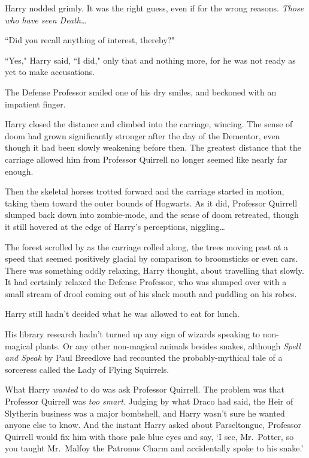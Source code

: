 Harry nodded grimly. It was the right guess, even if for the wrong reasons. \emph{Those who have seen Death{\ldots}}

``Did you recall anything of interest, thereby?"

``Yes," Harry said, ``I did," only that and nothing more, for he was not ready as yet to make accusations.

The Defense Professor smiled one of his dry smiles, and beckoned with an impatient finger.

Harry closed the distance and climbed into the carriage, wincing. The sense of doom had grown significantly stronger after the day of the Dementor, even though it had been slowly weakening before then. The greatest distance that the carriage allowed him from Professor Quirrell no longer seemed like nearly far enough.

Then the skeletal horses trotted forward and the carriage started in motion, taking them toward the outer bounds of Hogwarts. As it did, Professor Quirrell slumped back down into zombie-mode, and the sense of doom retreated, though it still hovered at the edge of Harry's perceptions, niggling{\ldots}

The forest scrolled by as the carriage rolled along, the trees moving past at a speed that seemed positively glacial by comparison to broomsticks or even cars. There was something oddly relaxing, Harry thought, about travelling that slowly. It had certainly relaxed the Defense Professor, who was slumped over with a small stream of drool coming out of his slack mouth and puddling on his robes.

Harry still hadn't decided what he was allowed to eat for lunch.

His library research hadn't turned up any sign of wizards speaking to non-magical plants. Or any other non-magical animals besides snakes, although \emph{Spell and Speak} by Paul Breedlove had recounted the probably-mythical tale of a sorceress called the Lady of Flying Squirrels.

What Harry \emph{wanted} to do was ask Professor Quirrell. The problem was that Professor Quirrell was \emph{too smart}. Judging by what Draco had said, the Heir of Slytherin business was a major bombshell, and Harry wasn't sure he wanted anyone else to know. And the instant Harry asked about Parseltongue, Professor Quirrell would fix him with those pale blue eyes and say, `I see, Mr.~Potter, so you taught Mr.~Malfoy the Patronus Charm and accidentally spoke to his snake.'

